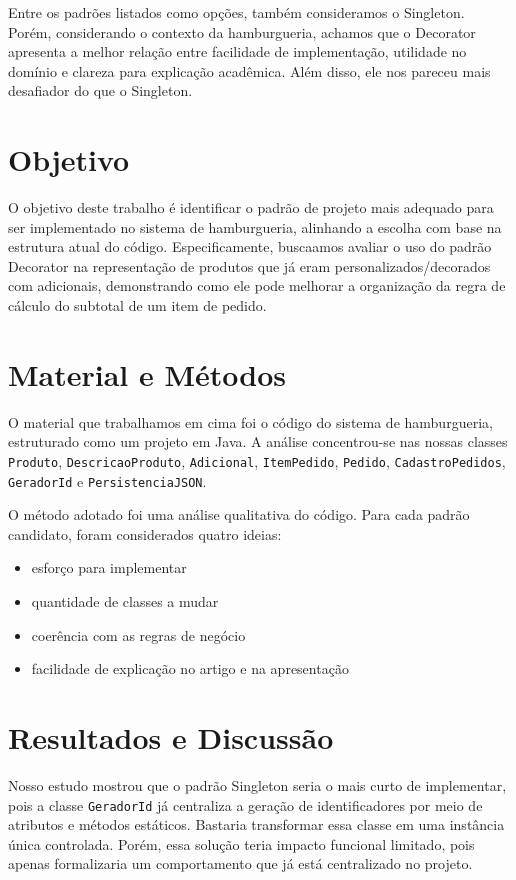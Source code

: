 \documentclass[12pt]{article}
\begin{document}
Entre os padrões listados como opções, também consideramos o Singleton. Porém, considerando o
contexto da hamburgueria, achamos que o Decorator apresenta a melhor relação entre
facilidade de implementação, utilidade no domínio e clareza para explicação
acadêmica. Além disso, ele nos pareceu mais desafiador do que o Singleton.

\section{Objetivo}

O objetivo deste trabalho é identificar o padrão de projeto mais
adequado para ser implementado no sistema de hamburgueria, alinhando a
escolha com base na estrutura atual do código.
Especificamente, buscaamos avaliar o uso do padrão Decorator na
representação de produtos que já eram personalizados/decorados com adicionais, 
demonstrando como ele pode melhorar a organização da regra de cálculo do subtotal 
de um item de pedido.

\section{Material e Métodos}

O material que trabalhamos em cima foi o código do sistema de hamburgueria, estruturado
como um projeto em Java. A análise concentrou-se nas nossas classes
\texttt{Produto}, \texttt{DescricaoProduto}, \texttt{Adicional},
\texttt{ItemPedido}, \texttt{Pedido}, \texttt{CadastroPedidos},
\texttt{GeradorId} e \texttt{PersistenciaJSON}.

O método adotado foi uma análise  qualitativa do código. Para cada padrão
candidato, foram considerados quatro ideias:

\begin{itemize}
    \item esforço para implementar
    \item quantidade de classes a mudar
    \item coerência com as regras de negócio
    \item facilidade de explicação no artigo e na apresentação
\end{itemize}

\section{Resultados e Discussão}

Nosso estudo mostrou que o padrão Singleton seria o mais curto de implementar,
pois a classe \texttt{GeradorId} já centraliza a geração de identificadores por
meio de atributos e métodos estáticos. Bastaria transformar essa classe em uma
instância única controlada. Porém, essa solução teria impacto funcional
limitado, pois apenas formalizaria um comportamento que já está centralizado no
projeto.
\end{document}
